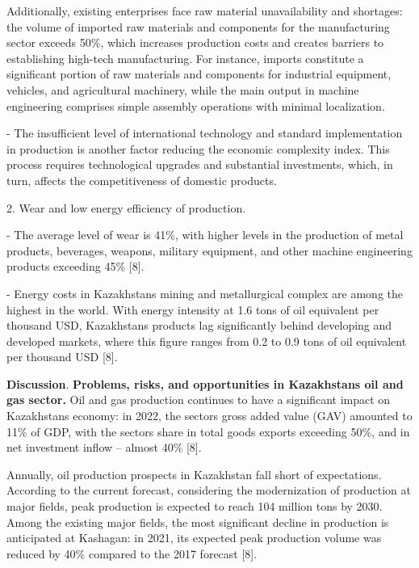 \begin{multicols}{2}
Additionally, existing enterprises face raw material unavailability and
shortages: the volume of imported raw materials and components for the
manufacturing sector exceeds 50\%, which increases production costs and
creates barriers to establishing high-tech manufacturing. For instance,
imports constitute a significant portion of raw materials and components
for industrial equipment, vehicles, and agricultural machinery, while
the main output in machine engineering comprises simple assembly
operations with minimal localization.

- The insufficient level of international technology and standard
implementation in production is another factor reducing the economic
complexity index. This process requires technological upgrades and
substantial investments, which, in turn, affects the competitiveness of
domestic products.

2. Wear and low energy efficiency of production.

- The average level of wear is 41\%, with higher levels in the
production of metal products, beverages, weapons, military equipment,
and other machine engineering products exceeding 45\% {[}8{]}.

- Energy costs in Kazakhstan\textquotesingle s mining and metallurgical
complex are among the highest in the world. With energy intensity at 1.6
tons of oil equivalent per thousand USD, Kazakhstan\textquotesingle s
products lag significantly behind developing and developed markets,
where this figure ranges from 0.2 to 0.9 tons of oil equivalent per
thousand USD {[}8{]}.

{\bfseries Discussion}. {\bfseries Problems, risks, and opportunities in
Kazakhstan\textquotesingle s oil and gas sector.} Oil and gas production
continues to have a significant impact on Kazakhstan\textquotesingle s
economy: in 2022, the sector\textquotesingle s gross added value (GAV)
amounted to 11\% of GDP, with the sector\textquotesingle s share in
total goods exports exceeding 50\%, and in net investment inflow --
almost 40\% {[}8{]}.

Annually, oil production prospects in Kazakhstan fall short of
expectations. According to the current forecast, considering the
modernization of production at major fields, peak production is expected
to reach 104 million tons by 2030. Among the existing major fields, the
most significant decline in production is anticipated at Kashagan: in
2021, its expected peak production volume was reduced by 40\% compared
to the 2017 forecast {[}8{]}.


\end{multicols}
